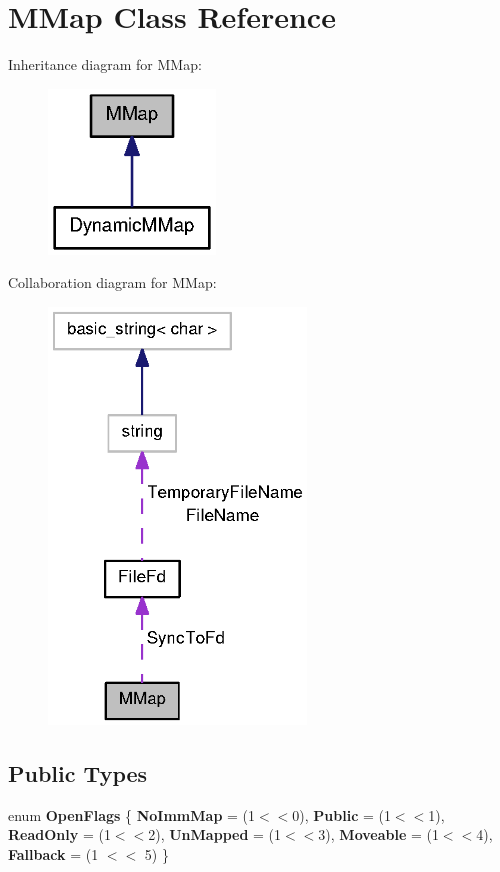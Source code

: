 \section{\-M\-Map \-Class \-Reference}
\label{classMMap}


\-Inheritance diagram for \-M\-Map\-:
\nopagebreak
\begin{figure}[H]
\begin{center}
\leavevmode
\includegraphics[width=126pt]{classMMap__inherit__graph}
\end{center}
\end{figure}


\-Collaboration diagram for \-M\-Map\-:
\nopagebreak
\begin{figure}[H]
\begin{center}
\leavevmode
\includegraphics[width=194pt]{classMMap__coll__graph}
\end{center}
\end{figure}
\subsection*{\-Public \-Types}
\begin{DoxyCompactItemize}
\item 
enum {\bfseries \-Open\-Flags} \{ \*
{\bfseries \-No\-Imm\-Map} =  (1$<$$<$0), 
{\bfseries \-Public} =  (1$<$$<$1), 
{\bfseries \-Read\-Only} =  (1$<$$<$2), 
{\bfseries \-Un\-Mapped} =  (1$<$$<$3), 
\*
{\bfseries \-Moveable} =  (1$<$$<$4), 
{\bfseries \-Fallback} =  (1 $<$$<$ 5)
 \}
\end{DoxyCompactItemize}

